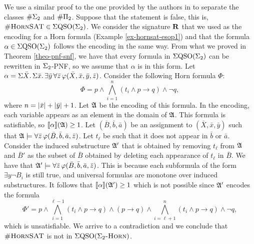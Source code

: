 We use a similar proof to the one provided by the authors in \cite{SalujaST95} to separate the classes $\#\Sigma_{2}$ and $\#\Pi_{2}$. Suppose that the statement is false, this is, $\textsc{\#HornSAT} \in \Sigma{\rm QSO}(\Sigma_{2})$. We consider the signature $\mathbf{R}$ that we used as the encoding for a Horn formula (Example \ref{ex-hornsat-esop1}) and that the formula $\alpha \in \Sigma{\rm QSO}(\Sigma_{2})$ follows the encoding in the same way. From what we proved in Theorem \ref{theo-pnf-snf}, we have that every formula in $\Sigma{\rm QSO}(\Sigma_{2})$ can be rewritten in $\Sigma_{2}$-PNF, so we assume that $\alpha$ is in this form. Let $\alpha = \Sigma{\bar{X}}.\,\Sigma{\bar{x}}.\,\exists\bar{y}\,\forall\bar{z}\,\varphi(\bar{X},\bar{x},\bar{y},\bar{z})$. Consider the following Horn formula $\Phi$:
$$
\Phi = p \wedge \bigwedge_{i = 1}^n (t_i \wedge p \to q) \wedge \neg q,
$$
where $n = \vert \bar{x} \vert + \vert \bar{y} \vert + 1$. Let $\mathfrak{A}$ be the encoding of this formula. In the encoding, each variable appears as an element in the domain of $\mathfrak{A}$. This formula is satisfiable, so ${\llbracket{}{\alpha}\rrbracket}(\mathfrak{A}) \geq 1$. Let $(\bar{B},\bar{b},\bar{a})$ be an assignment to $(\bar{X},\bar{x},\bar{y})$ such that $\mathfrak{A}\models\forall\bar{z}\,\varphi(\bar{B},\bar{b},\bar{a},\bar{z})$. Let $t_{\ell}$ be such that it does not appear in $\bar{b}$ or $\bar{a}$. Consider the induced substructure $\mathfrak{A}'$ that is obtained by removing $t_{\ell}$ from $\mathfrak{A}$ and $\bar{B}'$ as the subset of $\bar{B}$ obtained by deleting each appearance of $t_{\ell}$ in $\bar{B}$. We have that $\mathfrak{A}'\models\forall\bar{z}\,\varphi(\bar{B},\bar{b},\bar{a},\bar{z})$. This is because each subformula of the form $\exists y \neg B_i$ is still true, and universal formulas are monotone over induced substructures. It follows that ${\llbracket{}{\alpha}\rrbracket}(\mathfrak{A}') \geq 1$ which is not possible since $\mathfrak{A}'$ encodes the formula
$$
\Phi' = p \wedge \bigwedge_{i = 1}^{\ell-1} (t_i \wedge p \to q) \wedge (p\to q) \wedge \bigwedge_{i = \ell+1}^{n} (t_i \wedge p \to q) \wedge \neg q,
$$
which is unsatisfiable. We arrive to a contradiction and we conclude that $\textsc{\#HornSAT}$ is not in $\Sigma{\rm QSO}(\Sigma_2\textsc{-Horn})$.